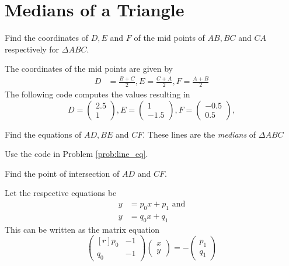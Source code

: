 \documentclass[journal,12pt,twocolumn]{IEEEtran}
\begin{document}
\section{Medians of a Triangle}
\begin{problem}
Find the coordinates of $D, E$ and $F$ of the mid points of $AB, BC$ and $CA$ respectively for  $\Delta ABC$. 
\end{problem} 
\solution
The coordinates of the mid points are given by
%
\begin{align}
D &= \frac{B+C}{2}, E = \frac{C+A}{2}, F = \frac{A+B}{2}
\end{align}
%
The following code computes the values resulting in
\begin{equation}
D = \begin{pmatrix}
2.5
\\
1
\end{pmatrix},
E = \begin{pmatrix}
1
\\
-1.5
\end{pmatrix},
F = \begin{pmatrix}
-0.5
\\
0.5
\end{pmatrix},
\end{equation}

\begin{problem}
Find the equations of $AD,BE$ and $CF$. These lines are the {\em medians} of $\Delta ABC$
\end{problem}
\solution Use the code in Problem \ref{prob:line_eq}. 
%
\begin{problem}
\label{prob:median}
Find the point of intersection of $AD$ and $CF$.
\end{problem}
\solution
Let the respective equations  be
\begin{align}
y &= p_0x + p_1 \text{ and}
\\
y &= q_0x+q_1
\end{align}
This can be written as the matrix equation
\begin{equation}
\begin{pmatrix*}[r]
p_0 & -1 
\\
q_0 & -1 
\end{pmatrix*}
\begin{pmatrix}
x
\\
y
\end{pmatrix}
=-
\begin{pmatrix}
p_1
\\
q_1
\end{pmatrix}
\end{equation}
\end{document}
